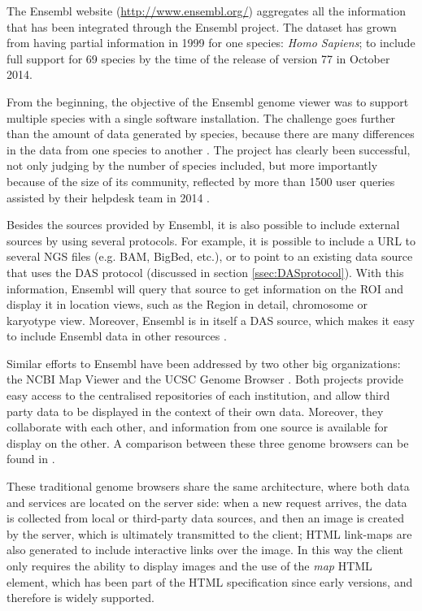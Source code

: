 The Ensembl website (\url{http://www.ensembl.org/}) aggregates all the information that has been integrated through the Ensembl project. The dataset has grown from having partial information in 1999 for one species: \emph{Homo Sapiens}; to include full support for 69 species by the time of the release of version 77 in October 2014. 

From the beginning, the objective of the Ensembl genome viewer was to support multiple species with a single software installation. The challenge goes further than the amount of data generated by species, because there are many differences in the data from one species to another \cite{STA2004}. The project has clearly been successful, not only judging by the number of species included, but more importantly because of the size of its community, reflected by more than 1500 user queries assisted by their helpdesk team in 2014 \cite{CUN2014}.

Besides the sources provided by Ensembl, it is also possible to include external sources by using several protocols. For example, it is possible to include a URL to several NGS files (e.g. BAM, BigBed, etc.), or to point to an existing data source that uses the DAS protocol (discussed in section \ref{ssec:DASprotocol}). With this information, Ensembl will query that source to get information on the ROI and display it in location views, such as the Region in detail, chromosome or karyotype view. Moreover, Ensembl is in itself a DAS source, which makes it easy to include Ensembl data in other resources \cite{SPU2010}.

Similar efforts to Ensembl have been addressed by two other big organizations: the NCBI Map Viewer \cite{ACL2014} and the UCSC Genome Browser \cite{ROS2014}. Both projects provide easy access to the centralised repositories of each institution, and allow third party data to be displayed in the context of their own data. Moreover, they collaborate with each other, and information from one source is available for display on the other. A comparison between these three genome browsers can be found in \cite{FUR2006}.

These traditional genome browsers share the same architecture, where both data and services are located on the server side: when a new request arrives, the data is collected from local or third-party data sources, and then an image is created by the server, which is ultimately transmitted to the client; HTML link-maps are also generated to include interactive links over the image. In this way the client only requires the ability to display images and the use of the \emph{map} HTML element, which has been part of the HTML specification since early versions, and therefore is widely supported.

